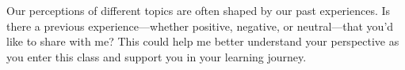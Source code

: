 \documentclass{ximera}
\author{Bart Snapp}
\begin{document}
\begin{question}
    Our perceptions of different topics are often shaped by our past experiences.
    Is there a previous experience---whether positive, negative, or neutral---that
    you'd like to share with me? This could help me better understand your
    perspective as you enter this class and support you in your learning journey.
    \begin{freeResponse}
    \end{freeResponse}
\end{question}
\end{document}
